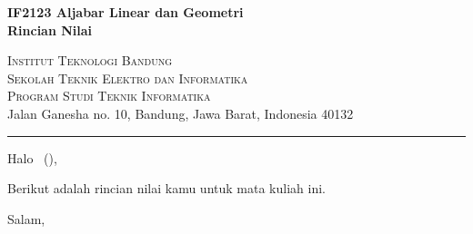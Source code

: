 \documentclass{letter}
\date{\today\hspace{0.025\linewidth}}
\newcommand{\university}{Institut Teknologi Bandung} %
\newcommand{\faculty}{Sekolah Teknik Elektro dan Informatika} %
\newcommand{\studyprogram}{Program Studi Teknik Informatika} %
\newcommand{\uniaddress}{Jalan Ganesha no. 10, Bandung, Jawa Barat, Indonesia 40132} %
\newcommand{\course}{IF2123 Aljabar Linear dan Geometri} %
\newcommand{\lecturername}{Nama Dosen} %
\newcommand{\lettertitle}{
    \centering
    \textbf{\course}\\ 
    \textbf{Rincian Nilai} %
    }
\newcommand{\createheader}{
    {\centering
        {
            \large
            \textsc{\university}\\
            \textsc{\faculty}\\
            \textsc{\studyprogram}\\[.25em]
        } 
        \uniaddress\\
    }
    {\centering\noindent\rule{0.95\linewidth}{0.4pt}\par}
}
\begin{document}
\begin{letter}{\lettertitle}
    \createheader

    \opening{Halo \studentname \ (\studentid),}
    Berikut adalah rincian nilai kamu untuk mata kuliah ini.

    \scoretable

    \signature{\lecturername}
    \closing{Salam,}

\end{letter}
\end{document}

